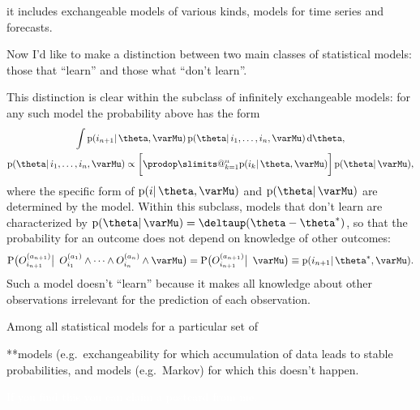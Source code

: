 \documentclass[\ifafour a4paper,12pt,\else a5paper,10pt,\fi%
onecolumn,oneside,article,%
british%
]{memoir}
\makeatletter
\theoremstyle{remark}
\theoremstyle{innote}
\def\prod{\DOTSI\prodop\slimits@}
\newcommand*{\delt}{\deltaup}%
\newcommand*{\di}{\mathrm{d}}%
\newcommand*{\pf}{\mathrm{p}}%
\newcommand*{\p}{\mathrm{P}}%
\renewcommand*{\|}{\mathpunct{|}}
\newcommand*{\lcond}[1][]{\mathpunct{#1|\ }}%
\newcommand*{\eg}{{e.g.}}
\newcommand*{\yO}[2]{O^{(#1)}_{#2}}
\newcommand*{\yM}{\varMu}
\newcommand*{\ytheta}{\theta^*}
\makeatother
\begin{document}
it includes exchangeable models of various
kinds, models for time series and forecasts.

\medskip

Now I'd like to make a distinction between two main classes of statistical
models: those that \enquote{learn} and those what \enquote{don't learn}.

This distinction is clear within the subclass of infinitely exchangeable
models: for any such model the probability above has the form
\begin{subequations} \label{eq:example_exchangeable}
  \begin{gather}
    \int \pf(i_{n+1} \| \theta,\yM)\,
    \pf(\theta \| i_{1}, \dotsc, i_{n}, \yM)\,\di\theta,
    \\
    \pf(\theta \| i_{1}, \dotsc, i_{n}, \yM) \propto
    \biggl[  \prod_{k=1}^n \pf(i_{k} \| \theta,\yM)  \biggr]
    \,
    \pf(\theta \|\yM), 
  \end{gather}
\end{subequations}
where the specific form of $\pf(i \| \theta,\yM)$ and $\pf(\theta \|\yM)$
are determined by the model. Within this subclass, models that don't learn
are characterized by $\pf(\theta \|\yM) = \delt(\theta-\ytheta)$, so that
the probability for an outcome does not depend on knowledge of other outcomes:
\begin{equation}
  \label{eq:extreme_exchang}
  \p\bigl(\yO{a_{n+1}}{i_{n+1}} \lcond[\big]
  \yO{a_{1}}{i_{1}} \land \dotsb \land \yO{a_{n}}{i_{n}} \land \yM \bigr)
  =
  \p\bigl(\yO{a_{n+1}}{i_{n+1}} \lcond[\big] \yM \bigr)
  \equiv \pf(i_{n+1} \| \ytheta,\yM).
\end{equation}
Such a model doesn't \enquote{learn} because it makes all knowledge about
other observations irrelevant for the prediction of each observation.



Among all statistical models for a particular set of 

**models (\eg\ exchangeability for which accumulation of data leads to
stable probabilities, and models (\eg\ Markov) for which this doesn't
happen.


\textcolor{white}{If you find this you can claim a postcard from me.}
%

\setlength{\intextsep}{0.5ex}%
\end{document}
